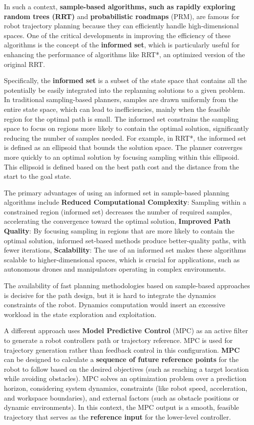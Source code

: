 In such a context, \textbf{sample-based algorithms, such as rapidly
exploring random trees (RRT)} and \textbf{probabilistic roadmaps} (PRM),
are famous for robot trajectory planning because they can efficiently
handle high-dimensional spaces. One of the critical developments in
improving the efficiency of these algorithms is the concept of the
\textbf{informed set}, which is particularly useful for enhancing the
performance of algorithms like RRT*, an optimized version of the
original RRT.

Specifically, the \textbf{informed set} is a subset of the state space
that contains all the potentially be easily integrated into the
replanning solutions to a given problem. In traditional sampling-based
planners, samples are drawn uniformly from the entire state space, which
can lead to inefficiencies, mainly when the feasible region for the
optimal path is small. The informed set constrains the sampling space to
focus on regions more likely to contain the optimal solution,
significantly reducing the number of samples needed. For example, in
RRT*, the informed set is defined as an ellipsoid that bounds the
solution space. The planner converges more quickly to an optimal
solution by focusing sampling within this ellipsoid. This ellipsoid is
defined based on the best path cost and the distance from the start to
the goal state.

The primary advantages of using an informed set in sample-based planning
algorithms include \textbf{Reduced Computational Complexity}: Sampling
within a constrained region (informed set) decreases the number of
required samples, accelerating the convergence toward the optimal
solution, \textbf{Improved Path Quality}: By focusing sampling in
regions that are more likely to contain the optimal solution, informed
set-based methods produce better-quality paths, with fewer iterations,
\textbf{Scalability}: The use of an informed set makes these algorithms
scalable to higher-dimensional spaces, which is crucial for
applications, such as autonomous drones and manipulators operating in
complex environments.

The availability of fast planning methodologies based on sample-based
approaches is decisive for the path design, but it is hard to integrate
the dynamics constraints of the robot. Dynamics computation would insert
an excessive workload in the state exploration and exploitation.

A different approach uses \textbf{Model Predictive Control} (MPC) as an
active filter to generate a robot controller\textquotesingle s path or
trajectory reference. MPC is used for trajectory generation rather than
feedback control in this configuration. \textbf{MPC} can be designed to
calculate a \textbf{sequence of future reference points} for the robot
to follow based on the desired objectives (such as reaching a target
location while avoiding obstacles). MPC solves an optimization problem
over a prediction horizon, considering system dynamics, constraints
(like robot speed, acceleration, and workspace boundaries), and external
factors (such as obstacle positions or dynamic environments). In this
context, the MPC output is a smooth, feasible trajectory that serves as
the \textbf{reference input} for the lower-level controller.

